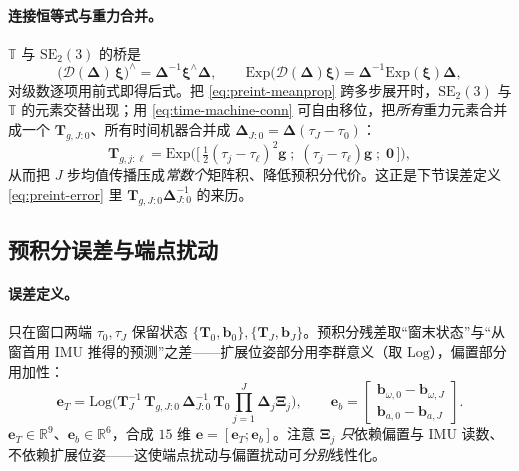 \paragraph{连接恒等式与重力合并。}
$\mathbb{T}$ 与 $\mathrm{SE}_2(3)$ 的桥是
\begin{equation}
  \big(\boldsymbol{\mathcal{D}}(\boldsymbol{\Delta})\,\boldsymbol{\xi}\big)^\wedge=\boldsymbol{\Delta}^{-1}\boldsymbol{\xi}^\wedge\boldsymbol{\Delta},\qquad
  \mathrm{Exp}\big(\boldsymbol{\mathcal{D}}(\boldsymbol{\Delta})\boldsymbol{\xi}\big)=\boldsymbol{\Delta}^{-1}\mathrm{Exp}(\boldsymbol{\xi})\boldsymbol{\Delta},
  \label{eq:time-machine-conn}
\end{equation}
对级数逐项用前式即得后式。把 \cref{eq:preint-meanprop} 跨多步展开时，$\mathrm{SE}_2(3)$ 与 $\mathbb{T}$ 的元素交替出现；用 \cref{eq:time-machine-conn} 可自由移位，把\emph{所有}重力元素合并成一个 $\mathbf{T}_{g,J:0}$、所有时间机器合并成 $\boldsymbol{\Delta}_{J:0}=\boldsymbol{\Delta}(\tau_J-\tau_0)$\cite{barfoot2024state}：
\begin{equation}
  \mathbf{T}_{g,j:\ell}=\mathrm{Exp}\!\big(\big[\,\tfrac12(\tau_j-\tau_\ell)^2\mathbf{g}\;;\;(\tau_j-\tau_\ell)\mathbf{g}\;;\;\mathbf{0}\,\big]\big),
  \label{eq:gravity-merge}
\end{equation}
从而把 $J$ 步均值传播压成\emph{常数个}矩阵积、降低预积分代价。这正是下节误差定义 \cref{eq:preint-error} 里 $\mathbf{T}_{g,J:0}\boldsymbol{\Delta}_{J:0}^{-1}$ 的来历。

\subsection{预积分误差与端点扰动}
\label{subsec:preint-error}

\paragraph{误差定义。}
只在窗口两端 $\tau_0,\tau_J$ 保留状态 $\{\mathbf{T}_0,\mathbf{b}_0\},\{\mathbf{T}_J,\mathbf{b}_J\}$。预积分残差取“窗末状态”与“从窗首用 IMU 推得的预测”之差——扩展位姿部分用李群意义（取 $\mathrm{Log}$），偏置部分用加性\cite{barfoot2024state}：
\begin{equation}
  \mathbf{e}_T=\mathrm{Log}\!\Big(\mathbf{T}_J^{-1}\,\mathbf{T}_{g,J:0}\,\boldsymbol{\Delta}_{J:0}^{-1}\,\mathbf{T}_0\textstyle\prod_{j=1}^{J}\boldsymbol{\Delta}_j\boldsymbol{\Xi}_j\Big),\qquad
  \mathbf{e}_b=\begin{bmatrix}\mathbf{b}_{\omega,0}-\mathbf{b}_{\omega,J}\\\mathbf{b}_{a,0}-\mathbf{b}_{a,J}\end{bmatrix}.
  \label{eq:preint-error}
\end{equation}
$\mathbf{e}_T\in\mathbb{R}^9$、$\mathbf{e}_b\in\mathbb{R}^6$，合成 $15$ 维 $\mathbf{e}=[\mathbf{e}_T;\mathbf{e}_b]$。注意 $\boldsymbol{\Xi}_j$ \emph{只}依赖偏置与 IMU 读数、不依赖扩展位姿——这使端点扰动与偏置扰动可\emph{分别}线性化。

